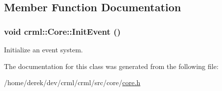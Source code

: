 \subsection{Member Function Documentation}
\hypertarget{classcrml_1_1_core_abd19dcc900bcca0b9ad0cf3a831329f9}{
\subsubsection[{InitEvent}]{\setlength{\rightskip}{0pt plus 5cm}void crml::Core::InitEvent ()}}
\label{classcrml_1_1_core_abd19dcc900bcca0b9ad0cf3a831329f9}


Initialize an event system. 



The documentation for this class was generated from the following file:\begin{DoxyCompactItemize}
\item 
/home/derek/dev/crml/crml/src/core/\hyperlink{core_8h}{core.h}\end{DoxyCompactItemize}
